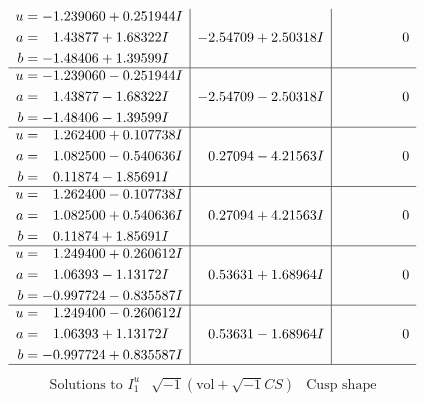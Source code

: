 \documentclass[1p]{elsarticle_modified}
\theoremstyle{definition}
\newcommand{\I}{\sqrt{-1}}
\begin{document}
$$\begin{array}{c|c|c}
\begin{aligned}
u &= -1.239060 + 0.251944 I \\
a &= \phantom{-}1.43877 + 1.68322 I \\
b &= -1.48406 + 1.39599 I\end{aligned}
 & -2.54709 + 2.50318 I & \phantom{-0.000000 } 0 \\ \hline\begin{aligned}
u &= -1.239060 - 0.251944 I \\
a &= \phantom{-}1.43877 - 1.68322 I \\
b &= -1.48406 - 1.39599 I\end{aligned}
 & -2.54709 - 2.50318 I & \phantom{-0.000000 } 0 \\ \hline\begin{aligned}
u &= \phantom{-}1.262400 + 0.107738 I \\
a &= \phantom{-}1.082500 - 0.540636 I \\
b &= \phantom{-}0.11874 - 1.85691 I\end{aligned}
 & \phantom{-}0.27094 - 4.21563 I & \phantom{-0.000000 } 0 \\ \hline\begin{aligned}
u &= \phantom{-}1.262400 - 0.107738 I \\
a &= \phantom{-}1.082500 + 0.540636 I \\
b &= \phantom{-}0.11874 + 1.85691 I\end{aligned}
 & \phantom{-}0.27094 + 4.21563 I & \phantom{-0.000000 } 0 \\ \hline\begin{aligned}
u &= \phantom{-}1.249400 + 0.260612 I \\
a &= \phantom{-}1.06393 - 1.13172 I \\
b &= -0.997724 - 0.835587 I\end{aligned}
 & \phantom{-}0.53631 + 1.68964 I & \phantom{-0.000000 } 0 \\ \hline\begin{aligned}
u &= \phantom{-}1.249400 - 0.260612 I \\
a &= \phantom{-}1.06393 + 1.13172 I \\
b &= -0.997724 + 0.835587 I\end{aligned}
 & \phantom{-}0.53631 - 1.68964 I & \phantom{-0.000000 } 0\\
 \hline 
 \end{array}$$\newpage$$\begin{array}{c|c|c}  
\text{Solutions to }I^u_{1}& \I (\text{vol} + \sqrt{-1}CS) & \text{Cusp shape}\\

\end{array}$$
\end{document}
